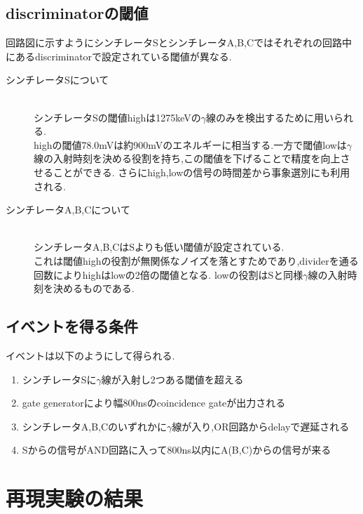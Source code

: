 \subsection{discriminatorの閾値}
回路図に示すようにシンチレータSとシンチレータA,B,Cではそれぞれの回路中にあるdiscriminatorで設定されている閾値が異なる.
\begin{description}
	\item[シンチレータSについて]\mbox{}\\
		シンチレータSの閾値highは1275keVの$\gamma$線のみを検出するために用いられる.\\
		highの閾値78.0mVは約900mVのエネルギーに相当する.一方で閾値lowは$\gamma$線の入射時刻を決める役割を持ち,この閾値を下げることで精度を向上させることができる.
		さらにhigh,lowの信号の時間差から事象選別にも利用される.
	\item[シンチレータA,B,Cについて]\mbox{}\\
		シンチレータA,B,CはSよりも低い閾値が設定されている.\\
		これは閾値highの役割が無関係なノイズを落とすためであり,dividerを通る回数によりhighはlowの2倍の閾値となる.
		lowの役割はSと同様$\gamma$線の入射時刻を決めるものである.
\end{description}

\subsection{イベントを得る条件}
イベントは以下のようにして得られる.
\begin{enumerate}
	\item シンチレータSに$\gamma$線が入射し2つある閾値を超える
	\item gate generatorにより幅800nsのcoincidence gateが出力される
	\item シンチレータA,B,Cのいずれかに$\gamma$線が入り,OR回路からdelayで遅延される
	\item Sからの信号がAND回路に入って800ns以内にA(B,C)からの信号が来る
\end{enumerate}

\section{再現実験の結果}

